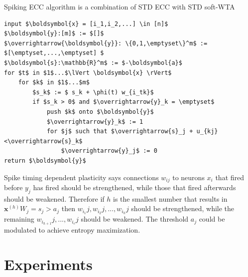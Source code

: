 \documentclass[oneside,english,logo]{amuthesis}
\begin{document}
\begin{definition} Spiking ECC algorithm is a combination of STD ECC with STD soft-WTA
\begin{lstlisting}
input $\boldsymbol{x} = [i_1,i_2,...] \in [n]$
$\boldsymbol{y}:[m]$ := $[]$  
$\overrightarrow{\boldsymbol{y}}: \{0,1,\emptyset\}^m$ := $[\emptyset,...,\emptyset] $ 
$\boldsymbol{s}:\mathbb{R}^m$ := $-\boldsymbol{a}$ 
for $t$ in $1$...$\lVert \boldsymbol{x} \rVert$   
    for $k$ in $1$...$m$
        $s_k$ := $ s_k + \phi(t) w_{i_tk}$ 
        if $s_k > 0$ and $\overrightarrow{y}_k = \emptyset$
            push $k$ onto $\boldsymbol{y}$
            $\overrightarrow{y}_k$ := 1
            for $j$ such that $\overrightarrow{s}_j + u_{kj}<\overrightarrow{s}_k$
                $\overrightarrow{y}_j$ := 0 
return $\boldsymbol{y}$
\end{lstlisting}
\end{definition}




 Spike timing dependent plasticity says connections $w_{ij}$ to neurons $x_i$ that fired before $y_j$ has fired should be strengthened, while those that fired afterwards should be weakened. Therefore if $h$ is the smallest number that results in $\boldsymbol{x}^{(h)} W_j = s_j > a_j$ then $w_{i_1}j,w_{i_2}j,...,w_{i_h}j$ should be strengthened, while the remaining $w_{i_{h+1}}j,...,w_{i_c}j$ should be weakened. The threshold $a_j$ could be modulated to achieve entropy maximization. 







\iffalse
\section{Experiments}
\end{document}
